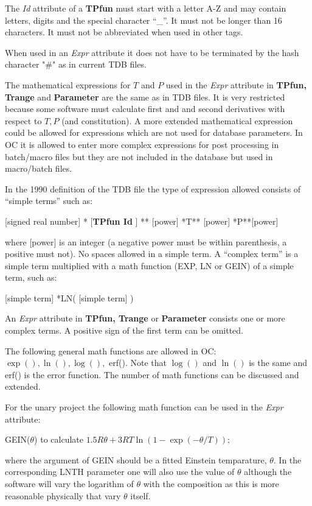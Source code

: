 \documentclass{article}
\begin{document}
The {\em Id} attribute of a {\bf TPfun} must start with a letter A-Z
and may contain letters, digits and the special character ``\_''.  It
must not be longer than 16 characters.  It must not be abbreviated
when used in other tags.

When used in an {\em Expr} attribute it does not have to be terminated
by the hash character "\#" as in current TDB files.

The mathematical expressions for $T$ and $P$ used in the {\em Expr}
attribute in {\bf TPfun, Trange} and {\bf Parameter} are the same as
in TDB files.  It is very restricted because some software must
calculate first and and second derivatives with respect to $T, P$ (and
constitution).  A more extended mathematical expression could be
allowed for expressions which are not used for database parameters.
In OC it is allowed to enter more complex expressions for post
processing in batch/macro files but they are not included in the
database but used in macro/batch files.

In the 1990 definition of the TDB file the type of expression allowed
consists of ``simple terms'' such as:

[signed real number] * [{\bf TPfun Id} ] ** [power] *T** [power] *P**[power]

where [power] is an integer (a negative power must be within
parenthesis, a positive must not).  No spaces allowed in a simple
term.  A ``complex term'' is a simple term multiplied with a math
function (EXP, LN or GEIN) of a simple term, such as:

[simple term] *LN( [simple term] )

An {\em Expr} attribute in {\bf TPfun, Trange} or {\bf Parameter}
consists one or more complex terms.  A positive sign of the first term
can be omitted.
  
The following general math functions are allowed in OC:\\ $\exp(),
\ln(), \log(),$ erf().  Note that $\log()$ and $\ln()$ is the same and
erf() is the error function.  The number of math functions can be
discussed and extended.

For the unary project the following math function can be used in the
{\em Expr} attribute:

GEIN($\theta$) to calculate $1.5R\theta+3RT\ln(1-\exp(-\theta/T));$

\noindent
where the argument of GEIN should be a fitted Einstein temparature,
$\theta$.  In the corresponding LNTH parameter one will also use the
value of $\theta$ although the software will vary the logarithm of
$\theta$ with the composition as this is more reasonable physically
that vary $\theta$ itself.
\end{document}
